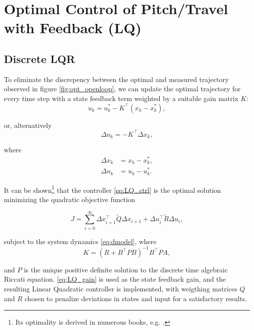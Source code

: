 \section{Optimal Control of Pitch/Travel with Feedback (LQ)}\label{sec:prob3}
\label{text:problem3}

\subsection{Discrete LQR}
\label{text:LQR}

To eliminate the discrepency between the optimal and measured trajectory observed in figure \ref{fig:opt_openloop}, we can update the optimal trajectory for every time step with a state feedback term weighted by a suitable gain matrix $K$:
\begin{equation*}
u_k = u_k^* - K^\top(x_k - x_k^*),
\end{equation*}

or, alternatively
\begin{equation}
\label{eq:LQ_ctrl}
\Delta u_k = - K^\top \Delta x_k,
\end{equation}

where 
\begin{align*}
\Delta x_k &= x_k - x_k^*,\\
\Delta u_k &= u_k - u_k^*.
\end{align*}

It can be shown\footnote{Its optimality is derived in numerous books, e.g. \cite{Kwakernaak1972}.} that the controller \eqref{eq:LQ_ctrl} is the optimal solution minimizing the quadratic objective function

\begin{equation*}
	J = \sum_{i=0}^{\infty} \Delta x_{i+1}^\top \tilde{Q} \Delta x_{i+1} + \Delta u_i^\top \tilde{R} \Delta u_i,
\end{equation*}

subject to the system dynamics \eqref{eq:dmodel}, where
\begin{equation}
\label{eq:LQ_gain}
	K = (R + B^\top P B)^{-1} B^\top P A,
\end{equation}

and $P$ is the unique positive definite solution to the discrete time algebraic Riccati equation. \eqref{eq:LQ_gain} is used as the state feedback gain, and the resulting Linear Quadratic controller is implemented, with weigthing matrices $Q$ and $R$ chosen to penalize deviations in states and input for a satisfactory results.

